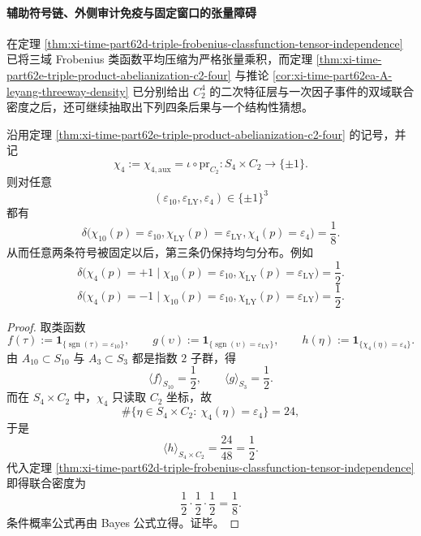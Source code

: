 \paragraph{辅助符号链、外侧审计免疫与固定窗口的张量障碍}
在定理 \ref{thm:xi-time-part62d-triple-frobenius-classfunction-tensor-independence} 已将三域 Frobenius 类函数平均压缩为严格张量乘积，而定理 \ref{thm:xi-time-part62e-triple-product-abelianization-c2-four} 与推论 \ref{cor:xi-time-part62ea-A-leyang-threeway-density} 已分别给出 \(C_2^4\) 的二次特征层与一次因子事件的双域联合密度之后，还可继续抽取出下列四条后果与一个结构性猜想。

\begin{corollary}\label{cor:xi-time-part62eb-three-sign-equidistribution}
沿用定理 \ref{thm:xi-time-part62e-triple-product-abelianization-c2-four} 的记号，并记
\[
\chi_4:=\chi_{4,\mathrm{aux}}=\iota\circ \mathrm{pr}_{C_2}:S_4\times C_2\to\{\pm1\}.
\]
则对任意
\[
(\varepsilon_{10},\varepsilon_{\mathrm{LY}},\varepsilon_4)\in\{\pm1\}^3
\]
都有
\[
\delta\!\bigl(
\chi_{10}(p)=\varepsilon_{10},
\chi_{\mathrm{LY}}(p)=\varepsilon_{\mathrm{LY}},
\chi_4(p)=\varepsilon_4
\bigr)
=
\frac18.
\]
从而任意两条符号被固定以后，第三条仍保持均匀分布。例如
\[
\delta\!\bigl(
\chi_4(p)=+1\mid
\chi_{10}(p)=\varepsilon_{10},
\chi_{\mathrm{LY}}(p)=\varepsilon_{\mathrm{LY}}
\bigr)=\frac12.
\]
\[
\delta\!\bigl(
\chi_4(p)=-1\mid
\chi_{10}(p)=\varepsilon_{10},
\chi_{\mathrm{LY}}(p)=\varepsilon_{\mathrm{LY}}
\bigr)=\frac12.
\]
\end{corollary}
\begin{proof}
取类函数
\[
f(\tau):=\mathbf 1_{\{\operatorname{sgn}(\tau)=\varepsilon_{10}\}},
\qquad
g(\upsilon):=\mathbf 1_{\{\operatorname{sgn}(\upsilon)=\varepsilon_{\mathrm{LY}}\}},
\qquad
h(\eta):=\mathbf 1_{\{\chi_4(\eta)=\varepsilon_4\}}.
\]
由 \(A_{10}\subset S_{10}\) 与 \(A_3\subset S_3\) 都是指数 \(2\) 子群，得
\[
\langle f\rangle_{S_{10}}=\frac12,
\qquad
\langle g\rangle_{S_3}=\frac12.
\]
而在 \(S_4\times C_2\) 中，\(\chi_4\) 只读取 \(C_2\) 坐标，故
\[
\#\{\eta\in S_4\times C_2:\ \chi_4(\eta)=\varepsilon_4\}=24,
\]
于是
\[
\langle h\rangle_{S_4\times C_2}=\frac{24}{48}=\frac12.
\]
代入定理 \ref{thm:xi-time-part62d-triple-frobenius-classfunction-tensor-independence} 即得联合密度为
\[
\frac12\cdot \frac12\cdot \frac12=\frac18.
\]
条件概率公式再由 Bayes 公式立得。证毕。
\end{proof}

